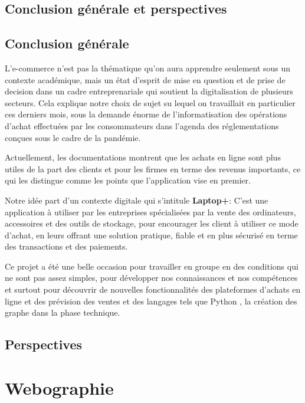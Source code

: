 \documentclass[a4paper]{report}
\begin{document}
\begin{doublespace}
    \chapter{Conclusion générale et perspectives}
    \fancyhead[L]{\hspace*{5cm}}
    \section{Conclusion générale}
    L'e-commerce n'est pas la thématique qu'on aura
    apprendre seulement sous un contexte académique, mais un état d'esprit de mise
    en question et de prise de decision dans un cadre entreprenariale qui soutient
    la digitalisation de plusieurs secteurs. Cela explique notre choix de sujet su
    lequel on travaillait en particulier ces derniers mois, sous la demande énorme
    de l'informatisation des opérations d'achat effectuées par les consommateurs
    dans l'agenda des réglementations conçues sous le cadre de la pandémie.

    Actuellement, les documentations montrent que les
    achats en ligne sont plus utiles de la part des clients et pour les firmes en
    terme des revenus importants, ce qui les distingue comme les points que
    l'application vise en premier.

    Notre idée part d'un contexte digitale qui s'intitule
    \textbf{Laptop+}: C’est une application à utiliser par les entreprises
    spécialisées par la vente des ordinateurs, accessoires et des outils de
    stockage, pour encourager les client à utiliser ce mode d'achat, en leurs
    offrant une solution pratique, fiable et en plus  sécurisé en terme des
    transactions et des paiements.

    Ce projet a été une belle occasion pour travailler en
    groupe en des conditions qui ne sont pas assez simples, pour développer nos
    connaissances et nos compétences et surtout pour
    découvrir de nouvelles fonctionnalités des plateformes d'achats en ligne et des
    prévision des ventes et des langages tels que Python , la création des graphe
    dans la phase technique.
    \section{Perspectives}
\end{doublespace}
\chapter{Webographie}
\fancyhead[L]{\hspace*{5cm}}
\end{document}
